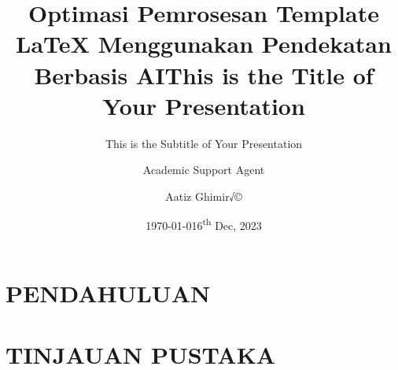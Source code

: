 \documentclass{beamer}
\title{Optimasi Pemrosesan Template LaTeX Menggunakan Pendekatan Berbasis AI}
\author{Academic Support Agent}
\date{\today}
\begin{document}
\maketitle

\begin{abstract}

\end{abstract}

\chapter{PENDAHULUAN}


\chapter{TINJAUAN PUSTAKA}


\usepackage{hyperref}
\usepackage[T1]{fontenc}
\usepackage{tribhuvan}

\usepackage{latexsym,amsmath,xcolor,multicol,booktabs,calligra}
\usepackage{graphicx,pstricks,listings,stackengine}

\usepackage[backend=biber,style=numeric]{biblatex}


\author{Aatiz Ghimir√©}
\title[This is the Short Title of Your Presentation]{This is the Title of Your Presentation}
\subtitle{This is the Subtitle of Your Presentation}
\date{6\textsuperscript{th} Dec, 2023}


\def\cmd#1{\texttt{\color{red}\footnotesize $\backslash$#1}}
\def\env#1{\texttt{\color{blue}\footnotesize #1}}

\end{document}

